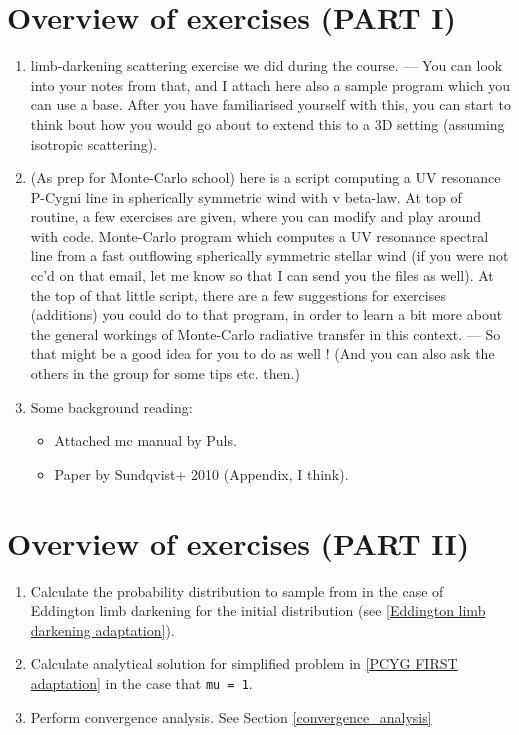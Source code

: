 \documentclass[../main/main.tex]{subfiles}
\begin{document}
\section{Overview of exercises (PART I)}

\begin{enumerate}
\item limb-darkening scattering exercise we did during the course. 
— You can look into your notes from that, and I attach here also a sample program which you can use a base. After you have familiarised yourself with this, you can start to think bout how you would go about to extend this to a 3D setting (assuming isotropic scattering). 

\item (As prep for Monte-Carlo school) here is a script computing a UV resonance P-Cygni line in spherically symmetric wind with v beta-law. At top of routine, a few exercises are given, where you can modify and play around with code. Monte-Carlo program which computes a UV resonance spectral line from a fast outflowing spherically symmetric stellar wind (if you were not cc’d on that email, let me know so that I can send you the files as well). At the top of that little script, there are a few suggestions for exercises (additions) you could do to that program, in order to learn a bit more about the general workings of Monte-Carlo radiative transfer in this context.  
— So that might be a good idea for you to do as well !   (And you can also ask the others in the group for some tips etc. then.) 

\item Some background reading: 
\begin{itemize}
\item Attached mc manual by Puls. 
\item Paper by Sundqvist+ 2010 (Appendix, I think). 
\end{itemize}
\end{enumerate}


\section{Overview of exercises (PART II)}
\label{Overview_Part_2}

\begin{enumerate}
\item Calculate the probability distribution to sample from in the case of Eddington limb darkening for the initial distribution (see \ref{Eddington limb darkening adaptation}).
\item Calculate analytical solution for simplified problem in \ref{PCYG FIRST adaptation} in the case that \texttt{mu = 1}.
\item Perform convergence analysis. See Section \ref{convergence_analysis}
\end{enumerate}
\end{document}
